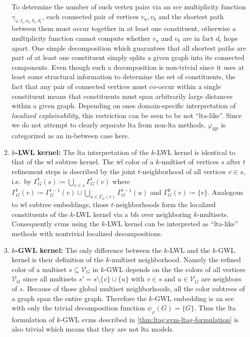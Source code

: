 \begin{enumerate}[label=\textbf{\arabic*.},ref={\arabic*}]
		To determine the number of such vertex pairs via an \ac{sce} multiplicity function $\gamma_{\varphi, t_i, a_i, b_i, d_i}$, each connected pair of vertices $v_a, v_b$ and the shortest path between them must occur together in at least one constituent, otherwise a multiplicity function cannot compute whether $v_a$ and $v_b$ are in fact $d_i$ hops apart.
		One simple decomposition which guarantees that all shortest paths are part of at least one constituent simply splits a given graph into its connected components.
		Even though such a decomposition is non-trivial since it uses at least some structural information to determine the set of constituents, the fact that any pair of connected vertices must co-occur within a single constituent means that constituents must span arbitrarily large distances within a given graph.
		Depending on ones domain-specific interpretation of \textit{localized explainability}, this restriction can be seen to be not ``\acs{lta}-like''.
		Since we do not attempt to clearly separate \ac{lta} from non-\acs{lta} methods, $\varphi_{\mathrm{SP}}$ is categorized as an in-between case here.
	\item \textbf{$k$-LWL kernel:}\label{itm:ltag:klwl-lta-formulation}
		The \ac{lta} interpretation of the $k$-LWL kernel is identical to that of the \ac{wl} subtree kernel.
		The \ac{wl} color of a $k$-multiset of vertices $s$ after $t$ refinement steps is described by the joint $t$-neighborhood of all vertices $v \in s$, i.e.\ by $\Gamma_{G}^t(s) \coloneqq \bigcup_{v \in s} \Gamma_{G}^t(v)$ where $\Gamma_{G}^t(v) \coloneqq \Gamma_{G}^{t-1}(v) \cup \bigcup_{u \in \Gamma_{G}(v)} \Gamma_{G}^{t-1}(u)$ and $\Gamma_{G}^0(v) \coloneqq \{ v \}$.
		Analogous to \ac{wl} subtree embeddings, those $t$-neighborhoods form the localized constituents of the $k$-LWL kernel via a \ac{bfs} over neighboring $k$-multisets.
		Consequently \acp{svm} using the $k$-LWL kernel can be interpreted as ``\acs{lta}-like'' methods with nontrivial localized decompositions.
	\item \textbf{$k$-GWL kernel:}\label{itm:ltag:kgwl-lta-formulation}
		The only difference between the $k$-LWL and the $k$-GWL kernel is their definition of the $k$-multiset neighborhood.
		Namely the refined color of a multiset $s \subseteq \mathcal{V}_G$ in $k$-GWL depends on the the colors of all vertices $\mathcal{V}_G$ since all multisets $s' = s \setminus \{ v \} \cup \{ u \}$ with $v \in s$ and $u \in \mathcal{V}_G$ are neighbors of $s$.
		Because of those global multiset neighborhoods, all the color subtrees of a graph span the entire graph.
		Therefore the $k$-GWL embedding is an \ac{sce} with only the trivial decomposition function $\psi_{\varphi}(G) = \{ G \}$.
		Thus the \ac{lta} formulation of $k$-GWL \acp{svm} described in \cref{thm:ltag:svm-ltag-formulation} is also trivial which means that they are not \ac{lta} models.
\end{enumerate}

